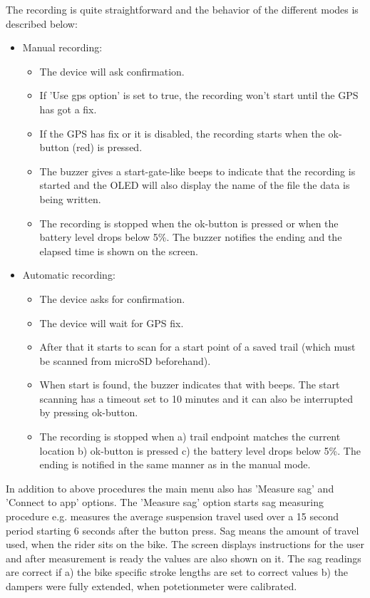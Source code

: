 \documentclass[a4paper,11pt]{article}
\begin{document}
The recording is quite straightforward and the behavior of the different modes is described below:

\begin{itemize}
    \item Manual recording:
    \begin{itemize}
        \item The device will ask confirmation.
        \item If 'Use gps option' is set to true, the recording won't start until the GPS has got a fix.
        \item If the GPS has fix or it is disabled, the recording starts when the ok-button (red) is pressed.
        \item The buzzer gives a start-gate-like beeps to indicate that the recording is started and the OLED will also display the name of the file the data is being written.
        \item The recording is stopped when the ok-button is pressed or when the battery level drops below 5\%. The buzzer notifies the ending and the elapsed time is shown on the screen.
    \end{itemize}

    \item Automatic recording:
    \begin{itemize}
        \item The device asks for confirmation.
        \item The device will wait for GPS fix.
        \item After that it starts to scan for a start point of a saved trail (which must be scanned from microSD beforehand).
        \item When start is found, the buzzer indicates that with beeps. The start scanning has a timeout set to 10 minutes and it can also be interrupted by pressing ok-button.
        \item The recording is stopped when a) trail endpoint matches the current location b) ok-button is pressed c) the battery level drops below 5\%. The ending is notified in the same manner as in the manual mode.
    \end{itemize}
\end{itemize}

In addition to above procedures the main menu also has 'Measure sag' and 'Connect to app' options. The 'Measure sag' option starts sag measuring procedure e.g. measures the average suspension travel used over a 15 second period starting 6 seconds after the button press. Sag means the amount of travel used, when the rider sits on the bike. The screen displays instructions for the user and after measurement is ready the values are also shown on it. The sag readings are correct if a) the bike specific stroke lengths are set to correct values b) the dampers were fully extended, when potetionmeter were calibrated.
\end{document}
